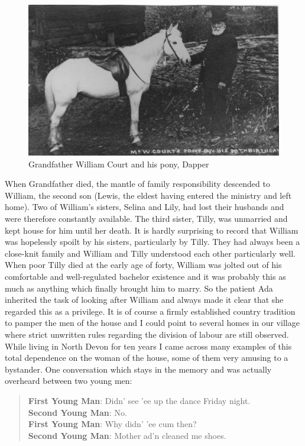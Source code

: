 \begin{figure}[]
	\centering
     \includegraphics[width=1\textwidth]{figures/DapperPony}
     \caption{Grandfather William Court and his pony, Dapper}
     \label{fig:Pony}
\end{figure}

When Grandfather died, the mantle of family responsibility descended to William, the second son (Lewis, the eldest having entered the ministry and left home). Two of William's sisters, Selina and Lily, had lost their husbands and were therefore constantly available. The third sister, Tilly, was unmarried and kept house for him until her death. It is hardly surprising to record that William was hopelessly spoilt by his sisters, particularly by Tilly. They had always been a close-knit family and William and Tilly understood each other particularly well. When poor Tilly died at the early age of forty, William was jolted out of his comfortable and well-regulated bachelor existence and it was probably this as much as anything which finally brought him to marry. So the patient Ada inherited the task of looking after William and always made it clear that she regarded this as a privilege. It is of course a firmly established country tradition to pamper the men of the house and I could point to several homes in our village where strict unwritten rules regarding the division of labour are still observed. While living in North Devon for ten years I came across many examples of this total dependence on the woman of the house, some of them very amusing to a bystander. One conversation which stays in the memory and was actually overheard between two young men:

\begin{quote}
\textbf{First Young Man}: Didn' see 'ee up the dance Friday night. \\
\textbf{Second Young Man}: No. \\ 
\textbf{First Young Man}: Why didn' 'ee cum then? \\
\textbf{Second Young Man}: Mother ad'n cleaned me shoes.
\end{quote}


